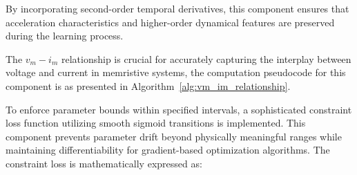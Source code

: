 \documentclass[11pt, oneside]{article}
\begin{document}
By incorporating second-order temporal derivatives, this component ensures that acceleration characteristics and higher-order dynamical features are preserved during the learning process.

The $v_m-i_m$ relationship is crucial for accurately capturing the interplay between voltage and current in memristive systems, the computation pseudocode for this component is as presented in Algorithm~\ref{alg:vm_im_relationship}.




To enforce parameter bounds within specified intervals, a sophisticated constraint loss function utilizing smooth sigmoid transitions is implemented. This component prevents parameter drift beyond physically meaningful ranges while maintaining differentiability for gradient-based optimization algorithms. The constraint loss is mathematically expressed as:
\end{document}
